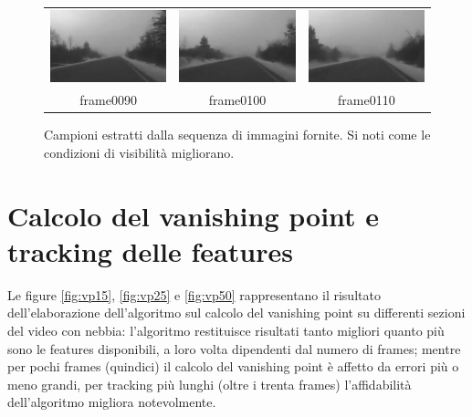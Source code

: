\documentclass[12pt]{report}
\begin{document}
\begin{figure}[H]
\begin{tabular}{ccc}
	\includegraphics[scale=\videoScale]{images/frame0090.jpg} & \includegraphics[scale=\videoScale]{images/frame0100.jpg} & \includegraphics[scale=\videoScale]{images/frame0110.jpg}\\
	frame0090 & frame0100 & frame0110 \\
\end{tabular}
\caption{Campioni estratti dalla sequenza di immagini fornite. Si noti come le condizioni di visibilit\`a migliorano.}
\label{fig:video}
\end{figure}

\section{Calcolo del vanishing point e tracking delle features}

\noindent Le figure \ref{fig:vp15}, \ref{fig:vp25} e \ref{fig:vp50} rappresentano il risultato dell'elaborazione dell'algoritmo sul calcolo del vanishing point su differenti sezioni del video con nebbia: l'algoritmo restituisce risultati tanto migliori quanto pi\`u sono le features disponibili, a loro volta dipendenti dal numero di frames; mentre per pochi frames (quindici) il calcolo del vanishing point \`e affetto da errori pi\`u o meno grandi, per tracking pi\`u lunghi (oltre i trenta frames) l'affidabilit\`a dell'algoritmo migliora notevolmente.\\
\end{document}
